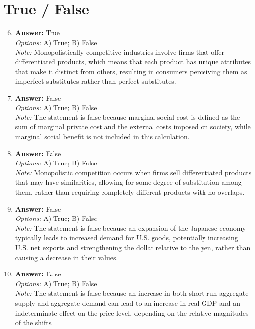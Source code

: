 \documentclass[12pt]{article}
\begin{document}
\section*{True / False}
\begin{enumerate}[label=\arabic*.]
\setcounter{enumi}{5}
\item \textbf{Answer:} True
\\ \textit{Options:} A) True; B) False
\\ \textit{Note:} Monopolistically competitive industries involve firms that offer differentiated products, which means that each product has unique attributes that make it distinct from others, resulting in consumers perceiving them as imperfect substitutes rather than perfect substitutes.
\item \textbf{Answer:} False
\\ \textit{Options:} A) True; B) False
\\ \textit{Note:} The statement is false because marginal social cost is defined as the sum of marginal private cost and the external costs imposed on society, while marginal social benefit is not included in this calculation.
\item \textbf{Answer:} False
\\ \textit{Options:} A) True; B) False
\\ \textit{Note:} Monopolistic competition occurs when firms sell differentiated products that may have similarities, allowing for some degree of substitution among them, rather than requiring completely different products with no overlaps.
\item \textbf{Answer:} False
\\ \textit{Options:} A) True; B) False
\\ \textit{Note:} The statement is false because an expansion of the Japanese economy typically leads to increased demand for U.S. goods, potentially increasing U.S. net exports and strengthening the dollar relative to the yen, rather than causing a decrease in their values.
\item \textbf{Answer:} False
\\ \textit{Options:} A) True; B) False
\\ \textit{Note:} The statement is false because an increase in both short-run aggregate supply and aggregate demand can lead to an increase in real GDP and an indeterminate effect on the price level, depending on the relative magnitudes of the shifts.
\end{enumerate}
\end{document}
